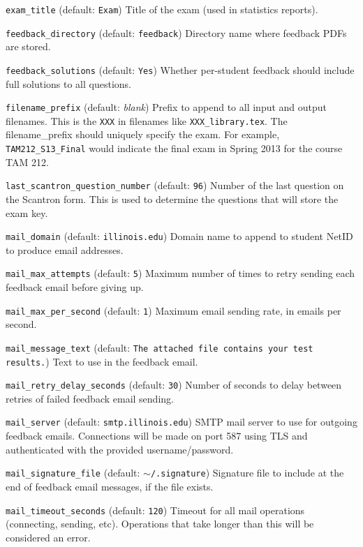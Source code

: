 \documentclass{article}
\begin{document}
\hangindent=1cm \texttt{exam_title} (default: \texttt{Exam}) Title of
the exam (used in statistics reports).

\hangindent=1cm \texttt{feedback_directory} (default:
\texttt{feedback}) Directory name where feedback PDFs are stored.

\hangindent=1cm \texttt{feedback_solutions} (default: \texttt{Yes})
Whether per-student feedback should include full solutions to all
questions.

\hangindent=1cm \texttt{filename_prefix} (default: \emph{blank})
Prefix to append to all input and output filenames. This is the
\texttt{XXX} in filenames like \texttt{XXX_library.tex}.  The
filename_prefix should uniquely specify the exam. For example,
\texttt{TAM212_S13_Final} would indicate the final exam in Spring 2013
for the course TAM 212.

\hangindent=1cm \texttt{last_scantron_question_number} (default:
\texttt{96}) Number of the last question on the Scantron form. This is
used to determine the questions that will store the exam key.

\hangindent=1cm \texttt{mail_domain} (default: \texttt{illinois.edu})
Domain name to append to student NetID to produce email addresses.

\hangindent=1cm \texttt{mail_max_attempts} (default: \texttt{5})
Maximum number of times to retry sending each feedback email before
giving up.

\hangindent=1cm \texttt{mail_max_per_second} (default: \texttt{1})
Maximum email sending rate, in emails per second.

\hangindent=1cm \texttt{mail_message_text} (default: \texttt{The
  attached file contains your test results.}) Text to use in the
feedback email.

\hangindent=1cm \texttt{mail_retry_delay_seconds} (default:
\texttt{30}) Number of seconds to delay between retries of failed
feedback email sending.

\hangindent=1cm \texttt{mail_server} (default:
\texttt{smtp.illinois.edu}) SMTP mail server to use for outgoing
feedback emails.  Connections will be made on port 587 using TLS and
authenticated with the provided username/password.

\hangindent=1cm \texttt{mail_signature_file} (default:
\texttt{$\sim$/.signature}) Signature file to include at the end of
feedback email messages, if the file exists.

\hangindent=1cm \texttt{mail_timeout_seconds} (default: \texttt{120})
Timeout for all mail operations (connecting, sending, etc).
Operations that take longer than this will be considered an error.
\end{document}
